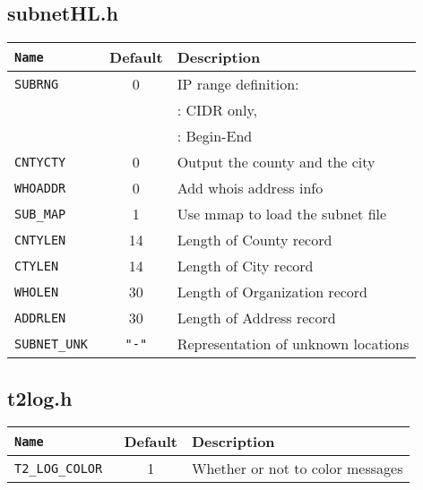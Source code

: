 \subsection{subnetHL.h}\label{subnetHL.h}
\begin{longtable}{>{\tt}lcl}%
    \toprule
    {\bf Name} & {\bf Default} & {\bf Description}\\%
    \midrule\endhead%
    SUBRNG      & 0               & IP range definition:\\
                &                 & \qquad 0: CIDR only,\\
                &                 & \qquad 1: Begin-End\\
    CNTYCTY     & 0               & Output the county and the city\\
    WHOADDR     & 0               & Add whois address info\\
    SUB\_MAP    & 1               & Use mmap to load the subnet file\\
    CNTYLEN     & 14              & Length of County record\\
    CTYLEN      & 14              & Length of City record\\
    WHOLEN      & 30              & Length of Organization record\\
    ADDRLEN     & 30              & Length of Address record\\
    SUBNET\_UNK & {\tt\small "-"} & Representation of unknown locations\\
    \bottomrule
\end{longtable}

\subsection{t2log.h}\label{t2log.h}
\begin{longtable}{>{\tt}lcl}%
    \toprule
    {\bf Name} & {\bf Default} & {\bf Description}\\%
    \midrule\endhead%
    T2\_LOG\_COLOR & 1 & Whether or not to color messages\\
    \bottomrule
\end{longtable}


